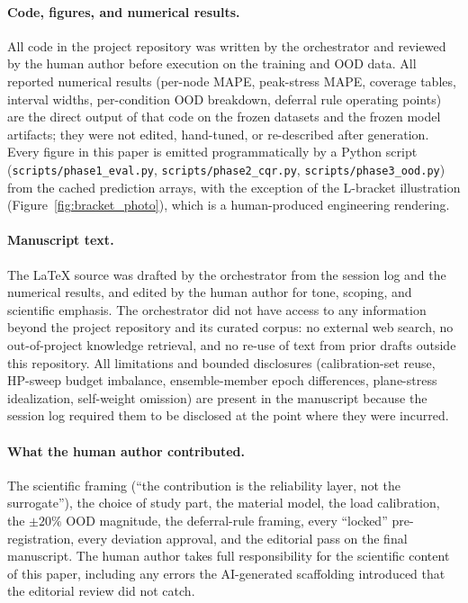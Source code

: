 \paragraph{Code, figures, and numerical results.}
All code in the project repository was written by the orchestrator and
reviewed by the human author before execution on the training and OOD
data. All reported numerical results (per-node MAPE, peak-stress MAPE,
coverage tables, interval widths, per-condition OOD breakdown, deferral
rule operating points) are the direct output of that code on the frozen
datasets and the frozen model artifacts; they were not edited,
hand-tuned, or re-described after generation. Every figure in this paper
is emitted programmatically by a Python script
(\texttt{scripts/phase1\_eval.py}, \texttt{scripts/phase2\_cqr.py},
\texttt{scripts/phase3\_ood.py}) from the cached prediction arrays, with
the exception of the L-bracket illustration (Figure~\ref{fig:bracket_photo}),
which is a human-produced engineering rendering.

\paragraph{Manuscript text.}
The LaTeX source was drafted by the orchestrator from the session log
and the numerical results, and edited by the human author for tone,
scoping, and scientific emphasis. The orchestrator did not have access
to any information beyond the project repository and its curated corpus:
no external web search, no out-of-project knowledge retrieval, and no
re-use of text from prior drafts outside this repository. All
limitations and bounded disclosures (calibration-set reuse, HP-sweep
budget imbalance, ensemble-member epoch differences, plane-stress
idealization, self-weight omission) are present in the manuscript
because the session log required them to be disclosed at the point where
they were incurred.

\paragraph{What the human author contributed.}
The scientific framing (``the contribution is the reliability layer,
not the surrogate''), the choice of study part, the material model, the
load calibration, the $\pm 20\%$ OOD magnitude, the deferral-rule
framing, every ``locked'' pre-registration, every deviation approval,
and the editorial pass on the final manuscript. The human author takes
full responsibility for the scientific content of this paper, including
any errors the AI-generated scaffolding introduced that the editorial
review did not catch.
